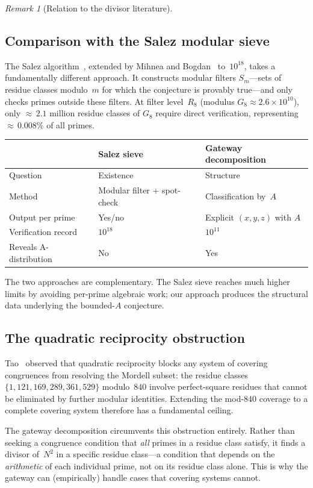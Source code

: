 \documentclass[12pt]{amsart}
\theoremstyle{definition}
\theoremstyle{remark}
\newtheorem{remark}[theorem]{Remark}
\begin{document}
\begin{remark}[Relation to the divisor literature]
\subsection{Comparison with the Salez modular sieve}

The Salez algorithm~\cite{Salez2014}, extended by Mihnea and
Bogdan~\cite{MihneaBogdan2025} to~$10^{18}$, takes a fundamentally
different approach.
It constructs modular filters $S_m$---sets of residue classes modulo~$m$
for which the conjecture is provably true---and only checks primes
outside these filters.
At filter level~$R_8$ (modulus $G_8 \approx 2.6 \times 10^{10}$),
only ${\approx}\,2.1$ million residue classes of $G_8$ require
direct verification, representing ${\approx}\,0.008\%$ of all primes.

\begin{center}
\small
\begin{tabular}{@{}lll@{}}
\toprule
 & Salez sieve & Gateway decomposition \\
\midrule
Question & Existence & Structure \\
Method & Modular filter + spot-check & Classification by~$A$ \\
Output per prime & Yes/no & Explicit $(x,y,z)$ with $A$ \\
Verification record & $10^{18}$ & $10^{11}$ \\
Reveals A-distribution & No & Yes \\
\bottomrule
\end{tabular}
\end{center}

The two approaches are complementary. The Salez sieve reaches much
higher limits by avoiding per-prime algebraic work; our approach
produces the structural data underlying the bounded-$A$ conjecture.

\subsection{The quadratic reciprocity obstruction}

Tao~\cite{Tao2011} observed that quadratic reciprocity blocks any
system of covering congruences from resolving the Mordell subset:
the residue classes $\{1, 121, 169, 289, 361, 529\}$ modulo~$840$
involve perfect-square residues that cannot be eliminated by further
modular identities.
Extending the mod-$840$ coverage to a complete covering system
therefore has a fundamental ceiling.

The gateway decomposition circumvents this obstruction entirely.
Rather than seeking a congruence condition that \emph{all} primes
in a residue class satisfy, it finds a divisor of~$N^2$ in a
specific residue class---a condition that depends on the \emph{arithmetic}
of each individual prime, not on its residue class alone.
This is why the gateway can (empirically) handle cases that covering
systems cannot.


\end{remark}
\end{document}
